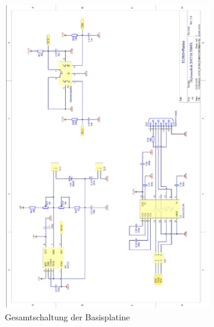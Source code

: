 \begin{figure}[htb]\ContinuedFloat
    \centering
    \includegraphics[width=0.8\textwidth]{Schuh/Pictures/Basis-Schaltung3}
    \caption[Gesamtschaltung der Basisplatine]{Gesamtschaltung der \gls{Basisplatine}}
\end{figure}
